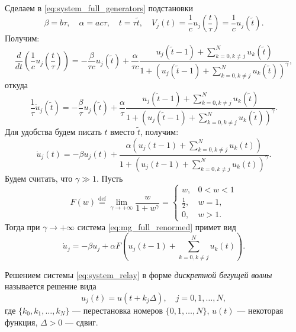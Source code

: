 Сделаем в \eqref{eq:system_full_generators} подстановки
%
\begin{equation}
	\label{eq:mg_norm}
	\beta = b \tau, \quad \alpha = ac \tau, \quad t = \tau \tilde{t}, \quad V_j(t) = \dfrac{1}{c}u_j\left(\dfrac{t}{\tau}\right) = \dfrac{1}{c}u_j(\tilde{t}).
\end{equation}
%
Получим:
%
\begin{equation*}
	\frac{d}{dt} \left(\dfrac{1}{c}u_j\left(\dfrac{t}{\tau}\right)\right)= -\dfrac{\beta}{\tau c}u_j(\tilde{t}) + \dfrac{\alpha}{\tau c}\dfrac{u_j(\tilde{t} - 1) + \sum\limits_{k = 0, k\neq j}^N u_k(\tilde{t})}{1 + \left(u_j(\tilde{t} - 1) + \sum\limits_{k = 0, k\neq j}^N u_k(\tilde{t})\right)^{\gamma}},
\end{equation*}
откуда
\begin{equation*}
	\frac{1}{\tau} \dot{u}_j(\tilde{t}) = -\dfrac{\beta}{\tau}u_j(\tilde{t}) + \dfrac{\alpha}{\tau}\dfrac{u_j(\tilde{t} - 1) + \sum\limits_{k = 0, k\neq j}^N u_k(\tilde{t})}{1 + \left(u_j(\tilde{t} - 1) + \sum\limits_{k = 0, k\neq j}^N u_k(\tilde{t})\right)^{\gamma}}.
\end{equation*}
%
Для удобства будем писать $t$ вместо $\tilde{t}$, получим:
%
\begin{equation}
	\label{eq:mg_full_renormed}
	\dot{u}_j(t) = -\beta u_j(t) + \dfrac{\alpha \left(u_j(t - 1) + \sum\limits_{k = 0, k\neq j}^N u_k(t)\right)}{1 + \left(u_j(t - 1) + \sum\limits_{k = 0, k\neq j}^N u_k(t)\right)^{\gamma}}.
\end{equation}
%
Будем считать, что $\gamma \gg 1$. Пусть 
%
\begin{equation}
\label{eq:relay_function_F}
F(w)\stackrel{\text{def}}{=}\lim\limits_{\gamma\rightarrow+\infty} \frac{w}{1+w^\gamma}=\left\lbrace\begin{array}{cl}
	w, & 0<w<1 \\
	\frac{1}{2}, & w=1, \\
	0, & w>1.
\end{array}\right.
\end{equation}
%
Тогда при $\gamma \to +\infty$ система \eqref{eq:mg_full_renormed} примет вид
%
\begin{equation}
\label{eq:system_relay}
\dot{u}_j=-\beta u_j+\alpha F\left(u_j(t-1)+\sum\limits_{k=0, k\neq j}^{N} u_{k}(t)\right).
\end{equation}

Решением системы \eqref{eq:system_relay} в форме \emph{дискретной бегущей волны} называется решение вида
%
\begin{equation}
	\label{eq:discrete_wave}
	u_j(t) = u(t + k_j\Delta), \quad j = 0, 1, \dots, N,
\end{equation}
где $\{k_0, k_1, \ldots, k_N\}$ --- перестановка номеров $\{0, 1, \ldots, N\}$, $u(t)$ --- некоторая функция, $\Delta > 0$ --- сдвиг.

